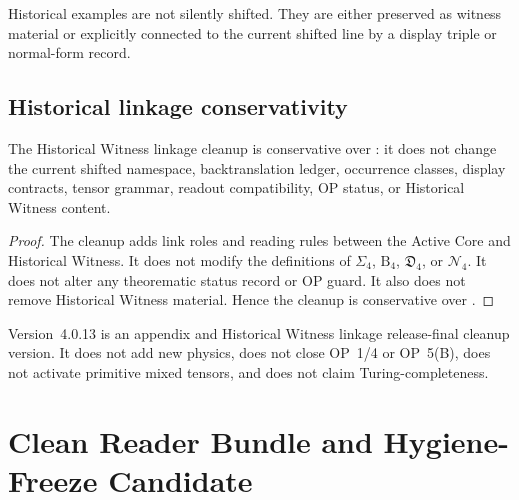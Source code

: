 \begin{remark}
\label{rem:v405-historical-examples-protected-from-silent-shift}
Historical examples are not silently shifted. They are either preserved as
witness material or explicitly connected to the current shifted line by a display
triple or normal-form record.
\end{remark}

\subsection{Historical linkage conservativity}
\label{subsec:v405-historical-linkage-conservativity}

\begin{theorem}
\label{thm:v405-historical-witness-linkage-conservativity}
The  Historical Witness linkage cleanup is conservative over : it
does not change the current shifted namespace, backtranslation ledger, occurrence
classes, display contracts, tensor grammar, readout compatibility, OP status,
or Historical Witness content.
\end{theorem}

\begin{proof}
The cleanup adds link roles and reading rules between the Active Core and
Historical Witness. It does not modify the definitions of $\Sigma_4$,
$\mathrm B_4$, $\mathfrak D_4$, or $\mathcal N_4$. It does not alter any
theorematic status record or OP guard. It also does not remove Historical
Witness material. Hence the cleanup is conservative over .
\end{proof}

\begin{remark}
\label{rem:v405-non-claim}
Version~4.0.13 is an appendix and Historical Witness linkage release-final cleanup version.
It does not add new physics, does not close OP~1/4 or OP~5(B), does not
activate primitive mixed tensors, and does not claim Turing-completeness.
\end{remark}



\clearpage
\section{ Clean Reader Bundle and Hygiene-Freeze Candidate}
\label{sec:v406-clean-reader-bundle-hygiene-freeze-release-final state}

